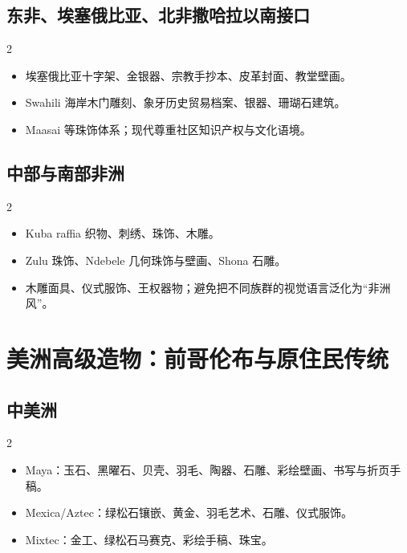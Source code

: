\documentclass[lang=en,a4paper,11pt]{elegantpaper}
\begin{document}
\subsection{东非、埃塞俄比亚、北非撒哈拉以南接口}


\begin{multicols}{2}
\begin{itemize}
\item 埃塞俄比亚十字架、金银器、宗教手抄本、皮革封面、教堂壁画。
\item Swahili 海岸木门雕刻、象牙历史贸易档案、银器、珊瑚石建筑。
\item Maasai 等珠饰体系；现代尊重社区知识产权与文化语境。
\end{itemize}
\end{multicols}

\subsection{中部与南部非洲}


\begin{multicols}{2}
\begin{itemize}
\item Kuba raffia 织物、刺绣、珠饰、木雕。
\item Zulu 珠饰、Ndebele 几何珠饰与壁画、Shona 石雕。
\item 木雕面具、仪式服饰、王权器物；避免把不同族群的视觉语言泛化为“非洲风”。
\end{itemize}
\end{multicols}

\section{美洲高级造物：前哥伦布与原住民传统}


\subsection{中美洲}


\begin{multicols}{2}
\begin{itemize}
\item Maya：玉石、黑曜石、贝壳、羽毛、陶器、石雕、彩绘壁画、书写与折页手稿。
\item Mexica/Aztec：绿松石镶嵌、黄金、羽毛艺术、石雕、仪式服饰。
\item Mixtec：金工、绿松石马赛克、彩绘手稿、珠宝。
\end{itemize}
\end{multicols}
\end{document}
